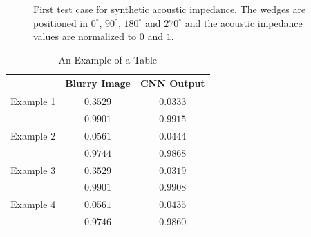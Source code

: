 \documentclass[conference,compsoc]{IEEEtran}
\begin{document}
\begin{figure}[!t]
{\label{fig_scenario2_blurred}}
\hfil
{}
\caption{First test case for synthetic acoustic impedance. The wedges are positioned in 
$0^{\circ}$, $90^{\circ}$, $180^{\circ}$ and $270^{\circ}$ and the acoustic impedance values are normalized to $0$ and $1$.}
\label{fig_scenario2}
\end{figure}


\begin{table}[!t]
\renewcommand{\arraystretch}{1.3}
\caption{An Example of a Table}
\label{table_caso_3}
\centering
\begin{tabular}{|c||c||c|}
\hline
 & Blurry Image & CNN Output \\
\hline
Example 1 & $0.3529$ & $0.0333$\\
\hline
	  & $0.9901$ & $0.9915$\\
\hline
Example 2 & $0.0561$ & $0.0444$ \\
\hline
	  & $0.9744$ & $0.9868$\\
\hline
Example 3 & $0.3529$ & $0.0319$\\
\hline
	  & $0.9901$ & $0.9908$\\
\hline
Example 4 & $0.0561$ & $0.0435$\\
\hline
	  & $0.9746$ & $0.9860$\\
\hline
\end{tabular}
\end{table}
\end{document}
